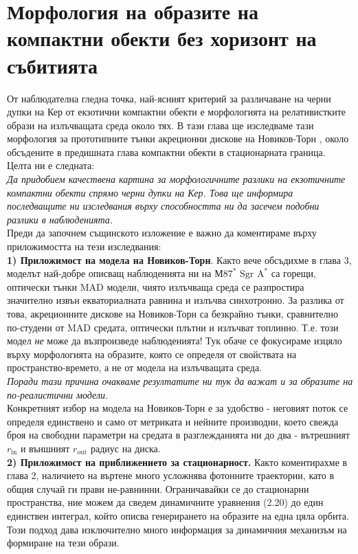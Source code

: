 \section{Морфология на образите на компактни обекти без хоризонт на събитията}
От наблюдателна гледна точка, най-ясният критерий за различаване на черни дупки на Кер от екзотични компактни обекти е морфологията на релативистките образи на излъчващата среда около тях. В тази глава ще изследваме тази морфология за прототипните тънки акреционни дискове на Новиков-Торн \cite{Page1973}, около обсъдените в предишната глава компактни обекти в стационарната граница. Целта ни е следната:\\

\emph{Да придобием качествена картина за морфологичните разлики на екзотичните компактни обекти спрямо черни дупки на Кер. Това ще информира последващите ни изследвания върху способността ни да засечем подобни разлики в наблюденията.}\\

Преди да започнем същинското изложение е важно да коментираме върху приложимостта на тези изследвания:\\

\textbf{1) Приложимост на модела на Новиков-Торн}. Както вече обсъдихме в глава 3, моделът най-добре описващ наблюденията ни на М$87^*$ $\text{Sgr A}^*$ са горещи, оптически тънки MAD модели, чиято излъчваща среда се разпростира значително извън екваториалната равнина и излъчва синхотронно. За разлика от това, акреционните дискове на Новиков-Торн са безкрайно тънки, сравнително по-студени от MAD средата, оптически плътни и излъчват топлинно. Т.е. този модел \emph{не} може да възпроизведе наблюденията! Тук обаче се фокусираме изцяло върху морфологията на образите, която се определя от свойствата на пространство-времето, а не от модела на излъчващата среда.\\

\emph{Поради тази причина очакваме резултатите ни тук да важат и за образите на по-реалистични модели.} \\

Конкретният избор на модела на Новиков-Торн е за удобство - неговият поток се определя единствено и само от метриката и нейните производни, което свежда броя на свободни параметри на средата в разглежданията ни до два - вътрешният $r_{\text{in}}$ и външният $r_\text{out}$ радиус на диска.\\

\textbf{2) Приложимост на приближението за стационарност.} Както коментирахме в глава 2, наличието на въртене много усложнява фотонните траектории, като в общия случай ги прави не-равнинни. Ограничавайки се до стационарни пространства, ние можем да сведем динамичните уравнения (2.20) до един единствен интеграл, който описва генерирането на образите на една цяла орбита. Този подход дава изключително много информация за динамичния механизъм на формиране на тези образи.\\


